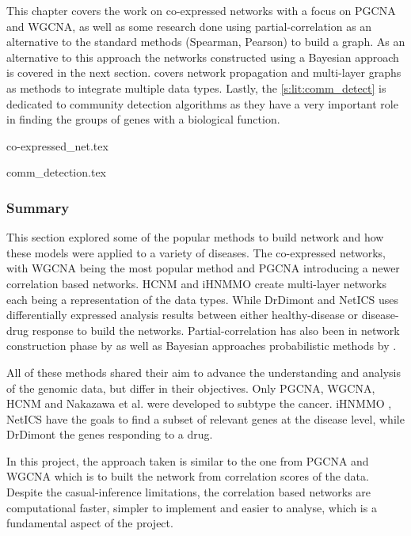 This chapter covers the work on co-expressed networks with a focus on PGCNA and WGCNA, as well as some research done using partial-correlation as an alternative to the standard methods (Spearman, Pearson) to build a graph. As an alternative to this approach the networks constructed using a Bayesian approach is covered in the next section.  covers network propagation and multi-layer graphs as methods to integrate multiple data types. Lastly, the \cref{s:lit:comm_detect} is dedicated to community detection algorithms as they have a very important role in finding the groups of genes with a biological function.

{co-expressed_net.tex}

{comm_detection.tex}


\subsubsection{Summary} 

This section explored some of the popular methods to build network and how these models were applied to a variety of diseases. The co-expressed networks, with WGCNA \cite{Langfelder2008-sn} being the most popular method and PGCNA \cite{Care2019-ij} introducing a newer correlation based networks. HCNM \cite{Vangimalla2021-fc} and iHNMMO \citet{Peng2017-ik} create multi-layer networks each being a representation of the data types. While DrDimont \cite{Hiort2022-lk} and NetICS \citet{Dimitrakopoulos2018-br} uses differentially expressed analysis results between either healthy-disease or disease-drug response to build the networks. Partial-correlation has also been in network construction phase by \citet{De_la_Fuente2004-ts} as well as Bayesian approaches  probabilistic methods by \cite{Nakazawa2021-yq, Tamada2011-ok, Tanaka2020-mw}.

All of these methods shared their aim to advance the understanding and analysis of the genomic data, but differ in their objectives. Only PGCNA, WGCNA, HCNM and Nakazawa et al.\cite{Care2019-ij, Langfelder2008-sn, Nakazawa2021-yq,  Vangimalla2021-fc} were developed to subtype the cancer. iHNMMO \cite{Peng2017-ik}, NetICS \cite{Dimitrakopoulos2018-br} have the goals to find a subset of relevant genes at the disease level, while DrDimont \cite{Hiort2022-lk} the genes responding to a drug. 

In this project, the approach taken is similar to the one from PGCNA and WGCNA which is to built the network from correlation scores of the data. Despite the casual-inference limitations, the correlation based networks are computational faster, simpler to implement and easier to analyse, which is a fundamental aspect of the project.

